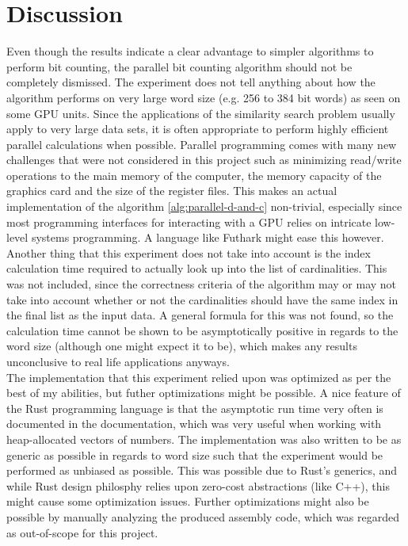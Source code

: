 \section{Discussion}
Even though the results indicate a clear advantage to simpler algorithms to perform bit counting, the parallel bit counting algorithm should not be completely dismissed. The experiment does not tell anything about how the algorithm performs on very large word size (e.g. 256 to 384 bit words) as seen on some GPU units\cite{techpowerup}. Since the applications of the similarity search problem usually apply to very large data sets, it is often appropriate to perform highly efficient parallel calculations when possible. Parallel programming comes with many new challenges that were not considered in this project such as minimizing read/write operations to the main memory of the computer, the memory capacity of the graphics card and the size of the register files. This makes an actual implementation of the algorithm \ref{alg:parallel-d-and-c} non-trivial, especially since most programming interfaces for interacting with a GPU relies on intricate low-level systems programming. A language like Futhark might ease this however\cite{futhark}.\\
Another thing that this experiment does not take into account is the index calculation time required to actually look up into the list of cardinalities. This was not included, since the correctness criteria of the algorithm may or may not take into account whether or not the cardinalities should have the same index in the final list as the input data. A general formula for this was not found, so the calculation time cannot be shown to be asymptotically positive in regards to the word size (although one might expect it to be), which makes any results unconclusive to real life applications anyways.\\
The implementation that this experiment relied upon was optimized as per the best of my abilities, but futher optimizations might be possible. A nice feature of the Rust programming language is that the asymptotic run time very often is documented in the documentation, which was very useful when working with heap-allocated vectors of numbers. The implementation was also written to be as generic as possible in regards to word size such that the experiment would be performed as unbiased as possible. This was possible due to Rust's generics, and while Rust design philosphy relies upon zero-cost abstractions\cite{rust-lang} (like C++), this might cause some optimization issues. Further optimizations might also be possible by manually analyzing the produced assembly code, which was regarded as out-of-scope for this project.\\

